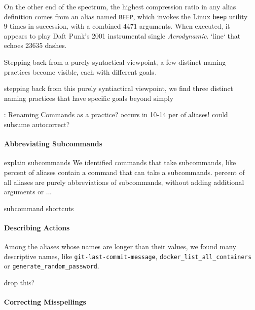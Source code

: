 On the other end of the spectrum, the highest compression ratio in any alias definition comes from an alias named \verb|BEEP|, which invokes the Linux \verb|beep| utility 9 times in succession, with a combined \num{4471} arguments.
When executed, it appears to play Daft Punk's 2001 instrumental single \emph{Aerodynamic}.
\TODO `line` that echoes 23635 dashes.

Stepping back from a purely syntactical viewpoint, a few distinct naming practices become visible, each with different goals.

stepping back from this purely syntiactical viewpoint, we find three distinct naming practices that have specific goals beyond simply 

\TODO: Renaming Commands as a practice? occurs in 10-14 per of aliases! could subsume autocorrect?

\paragraph{\bf Abbreviating Subcommands}

\TODO explain subcommands
We identified \TODO commands that take subcommands, like \TODO
\TODO percent of aliases contain a command that can take a subcommands.
\TODO percent of all aliases are purely abbreviations of subcommands, without adding additional arguments or ...

\TODO subcommand shortcuts

\paragraph{\bf Describing Actions}

Among the aliases whose names are longer than their values, we found many descriptive names, like \texttt{git-\allowbreak{}last-\allowbreak{}commit-\allowbreak{}message}, \texttt{docker\_\allowbreak{}list\_\allowbreak{}all\_\allowbreak{}containers} or \texttt{generate\_\allowbreak{}random\_\allowbreak{}password}.

\TODO drop this?

\paragraph{\bf Correcting Misspellings}

